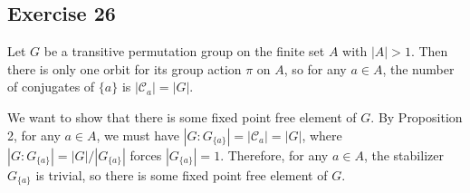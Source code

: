 \subsection*{Exercise 26}
Let $G$ be a transitive permutation group on the finite set $A$ with $|A| > 1$. Then there is only one orbit for its group action $\pi$ on $A$, so for any $a \in A$, the number of conjugates of $\{a\}$ is $|\mathcal{C}_a| = |G|$.

We want to show that there is some fixed point free element of $G$. By Proposition 2, for any $a \in A$, we must have $|G:G_{\{a\}}| = |\mathcal{C}_a| = |G|$, where $|G:G_{\{a\}}| = |G|/|G_{\{a\}}|$ forces $|G_{\{a\}}| = 1$. Therefore, for any $a \in A$, the stabilizer $G_{\{a\}}$ is trivial, so there is some fixed point free element of $G$.